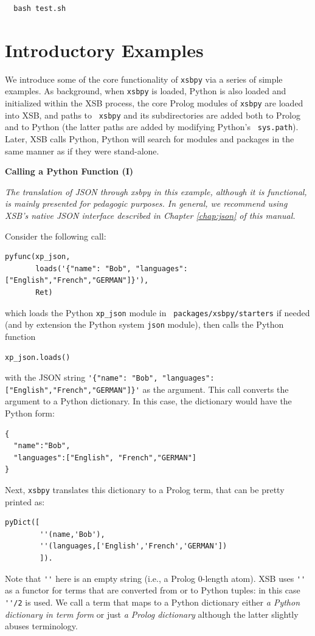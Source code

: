\begin{verbatim}
  bash test.sh
\end{verbatim}


\section{Introductory Examples}

We introduce some of the core functionality of {\tt xsbpy} via a
series of simple examples.  As background, when {\tt xsbpy} is loaded,
Python is also loaded and initialized within the XSB process, the core
Prolog modules of {\tt xsbpy} are loaded into XSB, and paths to {\tt
  xsbpy} and its subdirectories are added both to Prolog and to Python
(the latter paths are added by modifying Python's {\tt
  sys.path}). Later, XSB calls Python, Python will search for modules
and packages in the same manner as if they were stand-alone.

\begin{example} \rm {\bf Calling a Python Function (I)} \label{ex:xsbpy-json}

  {{\em The translation of JSON through xsbpy in this example,
      although it is functional, is mainly presented for pedagogic
      purposes.  In general, we recommend using XSB's native JSON
      interface described in Chapter \ref{chap:json} of this manual.
  }}

  
\noindent  
Consider the following call:

 \begin{verbatim}
pyfunc(xp_json,
       loads('{"name": "Bob", "languages": ["English","French","GERMAN"]}'),
       Ret)
\end{verbatim}
 
\noindent 
which loads the Python {\tt xp\_json} module in {\tt
  packages/xsbpy/starters} if needed (and by extension the Python
system {\tt json} module), then calls the Python function

{\tt xp\_json.loads()}

\noindent
with the JSON string
\verb|'{"name": "Bob", "languages": ["English","French","GERMAN"]}'|
as the argument.
This call converts the argument to a Python
dictionary.  In this case, the dictionary would have the Python form:
\begin{verbatim}
{
  "name":"Bob",
  "languages":["English", "French","GERMAN"]
}
\end{verbatim}
Next,
{\tt xsbpy} translates this dictionary to a Prolog term, that can
be pretty printed as:
\begin{verbatim}
pyDict([
        ''(name,'Bob'),
        ''(languages,['English','French','GERMAN'])
        ]).
\end{verbatim}
Note that \verb|''| here is an empty string (i.e., a Prolog 0-length
atom).  XSB uses \verb|''| as a functor for terms that are converted
from or to Python tuples: in this case \verb|''/2| is used.  We call a
term that maps to a Python dictionary either {\em a Python dictionary
  in term form} or just {\em a Prolog dictionary} although the latter
slightly abuses terminology.
\end{example}

